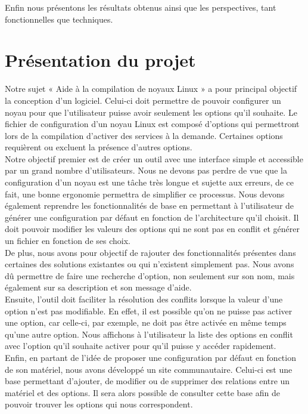 \documentclass[17pts]{report}
\begin{document}
Enfin nous présentons les résultats obtenus ainsi que les perspectives, tant
fonctionnelles que techniques.


\chapter{Présentation du projet}
\label{cha:Présentation du projet}
Notre sujet « Aide à la compilation de noyaux Linux » a pour principal objectif
la conception d'un logiciel. Celui-ci doit permettre de pouvoir configurer un
noyau pour que l'utilisateur puisse avoir seulement les options qu'il souhaite.
Le fichier de configuration d'un noyau Linux est composé d'options qui
permettront lors de la compilation d'activer des services à la demande.
Certaines options requièrent ou excluent la présence d'autres options.  \\

Notre objectif premier est de créer un outil avec une interface simple et
accessible par un grand nombre d'utilisateurs. Nous ne devons pas perdre de vue
que la configuration d'un noyau est une tâche très longue et sujette aux
erreurs, de ce fait, une bonne ergonomie permettra de simplifier ce processus.
Nous devons également reprendre les fonctionnalités de base en permettant à
l'utilisateur de générer une configuration par défaut en fonction de
l'architecture qu'il choisit. Il doit pouvoir modifier les valeurs des options
qui ne sont pas en conflit et générer un fichier en fonction de ses choix.  \\

De plus, nous avons pour objectif de rajouter des fonctionnalités présentes
dans certaines des solutions existantes ou qui n'existent simplement pas.  Nous
avons dû permettre de faire une recherche d'option, non seulement sur son nom,
mais également sur sa description et son message d'aide.  \\

Ensuite, l'outil doit faciliter la résolution des conflits lorsque la valeur
d'une option n'est pas modifiable. En effet, il est possible qu'on ne puisse
pas activer une option, car celle-ci, par exemple, ne doit pas être activée en
même temps qu'une autre option. Nous affichons à l'utilisateur la liste des
options en conflit avec l'option qu'il souhaite activer pour qu'il puisse y
accéder rapidement.  \\

Enfin, en partant de l'idée de proposer une configuration par défaut en
fonction de son matériel, nous avons développé un site communautaire.  Celui-ci
est une base permettant d'ajouter, de modifier ou de supprimer des relations
entre un matériel et des options. Il sera alors possible de consulter cette
base afin de pouvoir trouver les options qui nous correspondent.  \\
\end{document}
